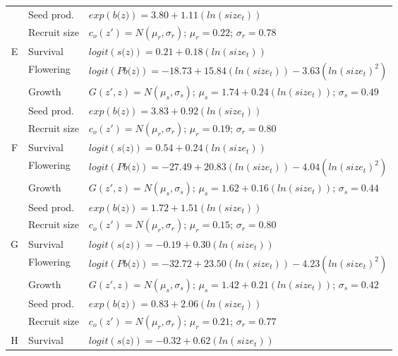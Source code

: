\documentclass[12pt, letterpaper]{article}
\begin{document}
\begin{spacing}{1.3}
\begin{longtable}[ht]{c|l|p{}}
         \rowcolor[gray]{.95}& Seed prod.  & $exp(\textit{b(z)}) = 3.80 + 1.11 (ln(size_t))$  \\
         & Recruit size  &  $c_o(z') = N(\mu_r, \sigma_r)$; $\mu_r = 0.22$; $\sigma_r = 0.78$ \\
         \hline
        \rowcolor[gray]{.95}E &   Survival  &   $logit(\textit{s(z)})= 0.21 +0.18(ln(size_t))$ \\
         & Flowering  & $logit(\textit{Pb(z)})  = -18.73 + 15.84(ln(size_t)) -3.63 (ln(size_t)^2)$ \\
         \rowcolor[gray]{.95}& Growth  &  $G(z',z) = N(\mu_s, \sigma_s)$; $\mu_s = 1.74 + 0.24(ln(size_t))$; $\sigma_s = 0.49$\\
         & Seed prod.  & $exp(\textit{b(z)}) = 3.83 + 0.92 (ln(size_t))$  \\
         \rowcolor[gray]{.95}& Recruit size  &  $c_o(z') = N(\mu_r, \sigma_r)$; $\mu_r = 0.19$; $\sigma_r = 0.80$ \\
         \hline
        F &  Survival  &   $logit(\textit{s(z)})= 0.54 +0.24(ln(size_t))$ \\
         \rowcolor[gray]{.95}& Flowering  & $logit(\textit{Pb(z)})  = -27.49 + 20.83(ln(size_t)) -4.04 (ln(size_t)^2)$ \\
         & Growth  &  $G(z',z) = N(\mu_s, \sigma_s)$; $\mu_s = 1.62 + 0.16(ln(size_t))$; $\sigma_s = 0.44$\\
         \rowcolor[gray]{.95}& Seed prod.  & $exp(\textit{b(z)}) = 1.72 + 1.51 (ln(size_t))$  \\
         & Recruit size  &  $c_o(z') = N(\mu_r, \sigma_r)$; $\mu_r = 0.15$; $\sigma_r = 0.80$ \\
         \hline
        \rowcolor[gray]{.95}G &  Survival  &  $logit(\textit{s(z)})= -0.19 +0.30(ln(size_t))$ \\
         & Flowering  & $logit(\textit{Pb(z)})  = -32.72 + 23.50(ln(size_t)) -4.23 (ln(size_t)^2)$ \\
         \rowcolor[gray]{.95}& Growth  &  $G(z',z) = N(\mu_s, \sigma_s)$; $\mu_s = 1.42 + 0.21(ln(size_t))$; $\sigma_s = 0.42$\\
         & Seed prod.  & $exp(\textit{b(z)}) = 0.83 + 2.06 (ln(size_t))$  \\
         \rowcolor[gray]{.95}& Recruit size  &  $c_o(z') = N(\mu_r, \sigma_r)$; $\mu_r = 0.21$; $\sigma_r = 0.77$ \\
         \hline
        H &  Survival  &  $logit(\textit{s(z)})= -0.32 +0.62(ln(size_t))$ \\

\end{longtable}
\end{spacing}
\end{document}
